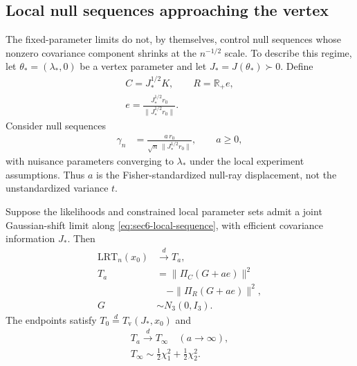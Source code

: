\subsection{Local null sequences approaching the vertex}
\label{subsec:pointwise_local_sequences}

The fixed-parameter limits do not, by themselves, control
null sequences whose nonzero covariance component shrinks
at the $n^{-1/2}$ scale. To describe this regime, let
$\theta_*=(\lambda_*,0)$ be a vertex parameter and let
$J_*=J(\theta_*)\succ0$. Define
\begin{equation}\label{eq:sec6-whitened-cones}
\begin{gathered}
C=J_*^{1/2}K,\qquad R=\mathbb R_+e,\\
e=\frac{J_*^{1/2}r_0}
{\|J_*^{1/2}r_0\|}.
\end{gathered}
\end{equation}
Consider null sequences
\begin{equation}\label{eq:sec6-local-sequence}
\begin{aligned}
\gamma_n
&=\frac{a\,r_0}
{\sqrt n\,\|J_*^{1/2}r_0\|},
\qquad a\geq0,
\end{aligned}
\end{equation}
with nuisance parameters converging to $\lambda_*$ under
the local experiment assumptions. Thus $a$ is the
Fisher-standardized null-ray displacement, not the
unstandardized variance $t$.

\begin{proposition}\label{prop:sec6-local-limit}
Suppose the likelihoods and constrained local parameter
sets admit a joint Gaussian-shift limit along
\eqref{eq:sec6-local-sequence}, with efficient covariance
information $J_*$. Then
\begin{equation}\label{eq:sec6-local-limit}
\begin{aligned}
\mathrm{LRT}_n(x_0)&\xrightarrow{d}T_a,\\
T_a&=\|\Pi_C(G+ae)\|^2\\
&\quad-\|\Pi_R(G+ae)\|^2,\\
G&\sim N_3(0,I_3).
\end{aligned}
\end{equation}
The endpoints satisfy
$T_0\stackrel d=T_{\mathrm v}(J_*,x_0)$
and
\begin{equation}\label{eq:sec6-infinity-limit}
\begin{gathered}
T_a\xrightarrow{d}T_\infty
\quad(a\to\infty),\\
T_\infty\sim
\tfrac12\chi_1^2+\tfrac12\chi_2^2.
\end{gathered}
\end{equation}
\end{proposition}

